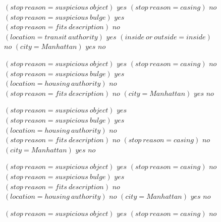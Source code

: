 \begin{figure}[h!]
\scriptsize
\begin{algorithmic}
\State \bif $(stop~reason = suspicious~object)$ \bthen $yes$ 
\State \belif $(stop~reason = casing)$ \bthen $no$
\State \belif $(stop~reason = suspicious~bulge)$ \bthen $yes$
\State \belif $(stop~reason = fits~description)$ \bthen $no$
\State \belif $(location = transit~authority)$ \bthen $yes$
\State \belif $(inside~or~outside = inside)$ \bthen $no$
\State \belif $(city = Manhattan)$ \bthen $yes$
\State \belse $no$
\end{algorithmic}
\vspace{0.5mm}
\begin{algorithmic}
\State \bif $(stop~reason = suspicious~object)$ \bthen $yes$ 
\State \belif $(stop~reason = casing)$ \bthen $no$
\State \belif $(stop~reason = suspicious~bulge)$ \bthen $yes$
\State \belif $(location = housing~authority)$ \bthen $no$
\State \belif $(stop~reason = fits~description)$ \bthen $no$
\State \belif $(city = Manhattan)$ \bthen $yes$
\State \belse $no$
\end{algorithmic}
\vspace{0.5mm}
\begin{algorithmic}
\State \bif $(stop~reason = suspicious~object)$ \bthen $yes$ 
\State \belif $(stop~reason = suspicious~bulge)$ \bthen $yes$
\State \belif $(location = housing~authority)$ \bthen $no$
\State \belif $(stop~reason = fits~description)$ \bthen $no$
\State \belif $(stop~reason = casing)$ \bthen $no$
\State \belif $(city = Manhattan)$ \bthen $yes$
\State \belse $no$
\end{algorithmic}
\vspace{0.5mm}
\begin{algorithmic}
\State \bif $(stop~reason = suspicious~object)$ \bthen $yes$ 
\State \belif $(stop~reason = casing)$ \bthen $no$
\State \belif $(stop~reason = suspicious~bulge)$ \bthen $yes$
\State \belif $(stop~reason = fits~description)$ \bthen $no$
\State \belif $(location = housing~authority)$ \bthen $no$
\State \belif $(city = Manhattan)$ \bthen $yes$
\State \belse $no$
\end{algorithmic}
\vspace{0.5mm}
\begin{algorithmic}
\State \bif $(stop~reason = suspicious~object)$ \bthen $yes$ 
\State \belif $(stop~reason = casing)$ \bthen $no$

\end{algorithmic}
\end{figure}

